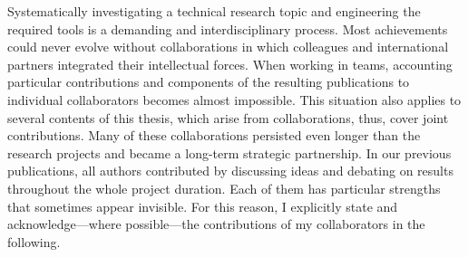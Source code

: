 

Systematically investigating a technical research topic and engineering the required tools is a demanding and interdisciplinary process. Most achievements could never evolve without collaborations in which colleagues and international partners integrated their intellectual forces. When working in teams, accounting particular contributions and components of the resulting publications to individual collaborators becomes almost impossible. This situation also applies to several contents of this thesis, which arise from collaborations, thus, cover joint contributions. Many of these collaborations persisted even longer than the research projects and became a long-term strategic partnership.
In our previous publications, all authors contributed by discussing ideas and debating on results throughout the whole project duration. Each of them has particular strengths that sometimes appear invisible. For this reason, I explicitly state and acknowledge---where possible---the contributions of my collaborators in the following.   
